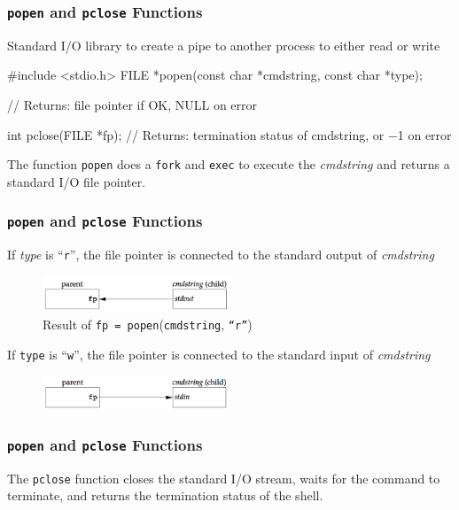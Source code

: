 \documentclass[newPxFont,sthlmFooter,nooffset]{beamer}
\begin{document}
\begin{frame}[t, fragile]
  \frametitle{\texttt{popen} and \texttt{pclose} Functions}
Standard I/O library to create a pipe to another process to either read or write
\begin{codedef}
#include <stdio.h>
FILE *popen(const char *cmdstring, const char *type);

// Returns: file pointer if OK, NULL on error

int pclose(FILE *fp);
// Returns: termination status of cmdstring, or −1 on error
\end{codedef}

The function \texttt{\texttt{popen}} does a \texttt{fork} and \texttt{exec} to execute the \textit{cmdstring} and returns a standard I/O file pointer.
\end{frame}



\begin{frame}[t]
  \frametitle{\texttt{popen} and \texttt{pclose} Functions}

If \textit{type} is ``\texttt{r}'', the file pointer is connected to the standard output of \textit{cmdstring}
  \begin{figure}[h]
    \centering
    \includegraphics[width=0.5\textwidth]{./figures/fig15_9-result-r.png}
    \caption{Result of \texttt{fp = popen}(\texttt{cmdstring}, \texttt{``r''})}
  \end{figure}

If \texttt{type} is ``\texttt{w}'', the file pointer is connected to the standard input of \textit{cmdstring}
  \begin{figure}[h]
    \centering
    \includegraphics[width=0.5\textwidth]{./figures/fig15_10-result-w.png}

  \end{figure}

\end{frame}



\begin{frame}[t]
  \frametitle{\texttt{popen} and \texttt{pclose} Functions}
The \texttt{pclose} function closes the standard I/O stream, waits for the command to terminate, and returns the termination status of the shell.
\end{frame}
\end{document}
